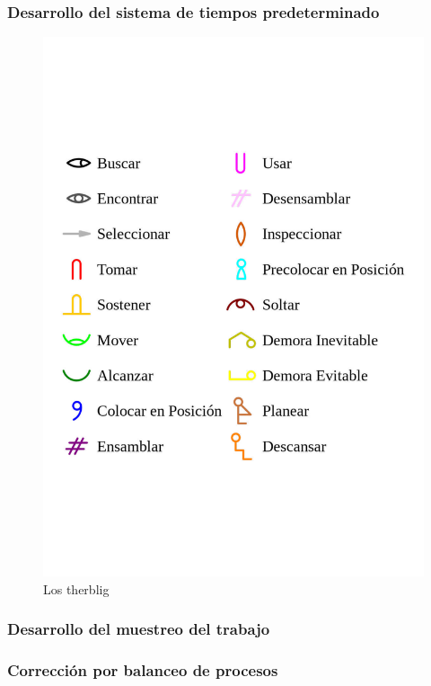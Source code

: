     \subsubsection{Desarrollo del sistema de tiempos predeterminado}
    \begin{figure}[H]
        \centering
        \includegraphics[scale=0.185]{30/img/therblig.pdf}
        \caption{Los therblig}
    \end{figure}
    \subsubsection{Desarrollo del muestreo del trabajo}
    
    \subsubsection{Corrección por balanceo de procesos}
